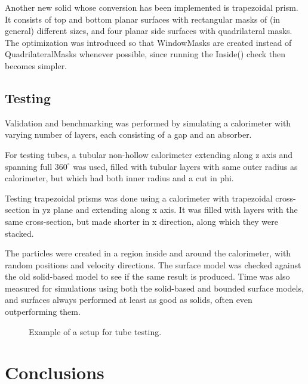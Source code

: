 \documentclass[12pt, a4paper]{article}
\begin{document}
Another new solid whose conversion has been implemented is trapezoidal prism. It consists of top and bottom planar surfaces with rectangular masks of (in general) different sizes, and four planar side surfaces with quadrilateral masks. The optimization was introduced so that WindowMasks are created instead of QuadrilateralMasks whenever possible, since running the {\selectfont Inside()} check then becomes simpler.


\subsection{Testing}

Validation and benchmarking was performed by simulating a calorimeter with varying number of layers, each consisting of a gap and an absorber.

For testing tubes, a tubular non-hollow calorimeter extending along z axis and spanning full $360^\circ$ was used, filled with tubular layers with same outer radius as calorimeter, but which had both inner radius and a cut in phi.

Testing trapezoidal prisms was done using a calorimeter with trapezoidal cross-section in yz plane and extending along x axis. It was filled with layers with the same cross-section, but made shorter in x direction, along which they were stacked.

The particles were created in a region inside and around the calorimeter, with random positions and velocity directions. The surface model was checked against the old solid-based model to see if the same result is produced. Time was also measured for simulations using both the solid-based and bounded surface models, and surfaces always performed at least as good as solids, often even outperforming them.

\begin{figure}[h]
\begin{minipage}{0.45\textwidth}
		\centering
		
\end{minipage}
\begin{minipage}{0.45\textwidth}
	\centering
	
\end{minipage}
\caption{Example of a setup for tube testing.}
\label{fig:testTubes}
\end{figure}


\section{Conclusions}

 
\end{document}
